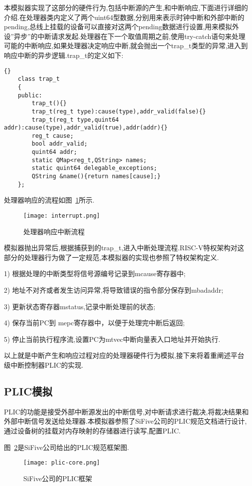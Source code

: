 本模拟器实现了这部分的硬件行为,包括中断源的产生,和中断响应,下面进行详细的介绍.在处理器类内定义了两个uint64型数据,分别用来表示时钟中断和外部中断的pending,总线上挂载的设备可以直接对这两个pending数据进行设置,用来模拟外设”异步”的中断请求发起.处理器在下一个取值周期之前,使用try-catch语句来处理可能的中断响应,如果处理器决定响应中断,就会抛出一个trap\_t类型的异常,进入到响应中断的异步逻辑.trap\_t的定义如下:
\begin{lstlisting}{}
    class trap_t
    {
    public:
        trap_t(){}
        trap_t(reg_t type):cause(type),addr_valid(false){}
        trap_t(reg_t type,quint64 addr):cause(type),addr_valid(true),addr(addr){}
        reg_t cause;
        bool addr_valid;
        quint64 addr;
        static QMap<reg_t,QString> names;
        static quint64 delegable_exceptions;
        QString &name(){return names[cause];}
    };        
\end{lstlisting}

处理器响应的流程如图~\ref{fig:interrupt}所示.
\begin{figure}[H]
    \centering
    \texttt{[image: interrupt.png]}
    \caption{处理器响应中断流程}
    \label{fig:interrupt}
\end{figure}

模拟器抛出异常后,根据捕获到的trap\_t,进入中断处理流程.RISC-V特权架构对这部分的处理器行为做了一定规范,本模拟器的实现也参照了特权架构定义.


1) 根据处理的中断类型将信号源编号记录到mcause寄存器中;


2) 地址不对齐或者发生访问异常,将导致错误的指令部分保存到mbadaddr;


3) 更新状态寄存器mstatus,记录中断处理前的状态;


4) 保存当前PC到 mepc寄存器中，以便于处理完中断后返回;


5) 停止当前执行程序流,设置PC为mtvec中断向量表入口地址并开始执行.


以上就是中断产生和响应过程对应的处理器硬件行为模拟,接下来将着重阐述平台级中断控制器PLIC的实现.


\subsection{PLIC模拟}

PLIC的功能是接受外部中断源发出的中断信号,对中断请求进行裁决,将裁决结果和外部中断信号发送给处理器.本模拟器参照了SiFive公司的PLIC规范文档进行设计,通过设备树的挂载对内存映射的存储器进行读写,配置PLIC.


图~\ref{fig:plic-core}是SiFive公司给出的PLIC规范框架图.
\begin{figure}[H]
    \centering
    \texttt{[image: plic-core.png]}
    \caption{SiFive公司的PLIC框架}
    \label{fig:plic-core}
\end{figure}



